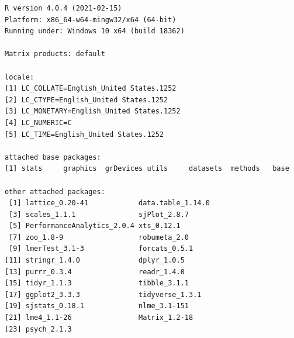 \documentclass[
  english,
]{book}
\begin{document}
\begin{verbatim}
R version 4.0.4 (2021-02-15)
Platform: x86_64-w64-mingw32/x64 (64-bit)
Running under: Windows 10 x64 (build 18362)

Matrix products: default

locale:
[1] LC_COLLATE=English_United States.1252 
[2] LC_CTYPE=English_United States.1252   
[3] LC_MONETARY=English_United States.1252
[4] LC_NUMERIC=C                          
[5] LC_TIME=English_United States.1252    

attached base packages:
[1] stats     graphics  grDevices utils     datasets  methods   base     

other attached packages:
 [1] lattice_0.20-41            data.table_1.14.0         
 [3] scales_1.1.1               sjPlot_2.8.7              
 [5] PerformanceAnalytics_2.0.4 xts_0.12.1                
 [7] zoo_1.8-9                  robumeta_2.0              
 [9] lmerTest_3.1-3             forcats_0.5.1             
[11] stringr_1.4.0              dplyr_1.0.5               
[13] purrr_0.3.4                readr_1.4.0               
[15] tidyr_1.1.3                tibble_3.1.1              
[17] ggplot2_3.3.3              tidyverse_1.3.1           
[19] sjstats_0.18.1             nlme_3.1-151              
[21] lme4_1.1-26                Matrix_1.2-18             
[23] psych_2.1.3               


\end{verbatim}
\end{document}
